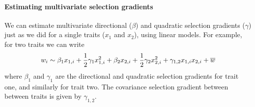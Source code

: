 

\paragraph{Estimating multivariate selection gradients}
We can estimate multivariate directional ($\beta$) and quadratic selection
gradients ($\gamma$) just as we did for a single traits ($x_1$ and $x_2$), using linear
models. For example, for two traits we can write
\begin{equation}
w_i \sim \beta_1 x_{1,i} + \frac{1}{2} \gamma_1 x_{1,i}^2 + \beta_2 x_{2,i} + \frac{1}{2} 
\gamma_2 x_{2,i}^2  + \gamma_{1,2} x_{1,i} x_{2,i}  + \overline{w} \label{fitness_regression}
 \end{equation}
where $\beta_1$ and $\gamma_1$ are the directional and quadratic
selection gradients for trait one, and similarly for trait two. The
covariance selection gradient between between traits is given by
$\gamma_{1,2}$. 

